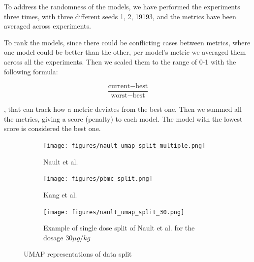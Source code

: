 \documentclass[12pt, a4paper]{article}
\begin{document}
To address the randomness of the models, we have performed the experiments three times, with three different seeds 1, 2, 19193, and the metrics have been averaged across experiments.

To rank the models, since there could be conflicting cases between metrics, where one model could be better than the other, per model's metric we averaged them across all the experiments. Then we scaled them to the range of 0-1 with the following formula:

\[\frac{\text{current} - \text{best}}{\text{worst} - \text{best}}\]


, that can track how a metric deviates from the best one. Then we summed all the metrics, giving a score (penalty) to each model. The model with the lowest score is considered the best one.

\begin{figure}[h!]
    \centering
    \begin{subfigure}[t]{0.48\textwidth}
        \centering
        \texttt{[image: figures/nault\_umap\_split\_multiple.png]}
        \caption{Nault et al. \cite{nault2021single,nault2022benchmarking}}
        \label{fig:nault_umap}
    \end{subfigure}
    \hfill
    \begin{subfigure}[t]{0.48\textwidth}
        \centering
        \texttt{[image: figures/pbmc\_split.png]}
        \caption{Kang et al. \cite{kanaGenerativeModelingSinglecell2023}}
        \label{fig:pbmc_umap}
    \end{subfigure}
    \begin{subfigure}[b]{0.48\textwidth}
        \centering
        \texttt{[image: figures/nault\_umap\_split\_30.png]}
        \caption{Example of single dose split of Nault et al. \cite{kanaGenerativeModelingSinglecell2023} for the dosage $30 \mu g/kg$}
        \label{fig:pbmc_umap}
    \end{subfigure}    
    \caption{UMAP representations of data split}
    \label{fig:umap_side_by_side}
\end{figure}


\end{document}
